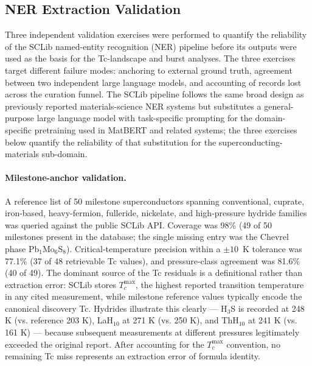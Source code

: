 \documentclass[11pt]{article}
\begin{document}
\subsection{NER Extraction Validation}
\label{subsec:ner-validation}

Three independent validation exercises were performed to quantify the reliability of the SCLib named-entity recognition (NER) pipeline before its outputs were used as the basis for the Tc-landscape and burst analyses. The three exercises target different failure modes: anchoring to external ground truth, agreement between two independent large language models, and accounting of records lost across the curation funnel. The SCLib pipeline follows the same broad design as previously reported materials-science NER systems \cite{weston2019nermatlitt,trewartha2022matscibert} but substitutes a general-purpose large language model with task-specific prompting for the domain-specific pretraining used in MatBERT and related systems; the three exercises below quantify the reliability of that substitution for the superconducting-materials sub-domain.

\paragraph{Milestone-anchor validation.} A reference list of 50 milestone superconductors spanning conventional, cuprate, iron-based, heavy-fermion, fulleride, nickelate, and high-pressure hydride families was queried against the public SCLib API. Coverage was 98\% (49 of 50 milestones present in the database; the single missing entry was the Chevrel phase Pb$_{1}$Mo$_{6}$S$_{8}$). Critical-temperature precision within a $\pm 10$~K tolerance was 77.1\% (37 of 48 retrievable Tc values), and pressure-class agreement was 81.6\% (40 of 49). The dominant source of the Tc residuals is a definitional rather than extraction error: SCLib stores $T_c^{\mathrm{max}}$, the highest reported transition temperature in any cited measurement, while milestone reference values typically encode the canonical discovery Tc. Hydrides illustrate this clearly --- H$_3$S is recorded at 248 K (vs. reference 203 K), LaH$_{10}$ at 271 K (vs. 250 K), and ThH$_{10}$ at 241 K (vs. 161 K) --- because subsequent measurements at different pressures legitimately exceeded the original report. After accounting for the $T_c^{\mathrm{max}}$ convention, no remaining Tc miss represents an extraction error of formula identity.
\end{document}
